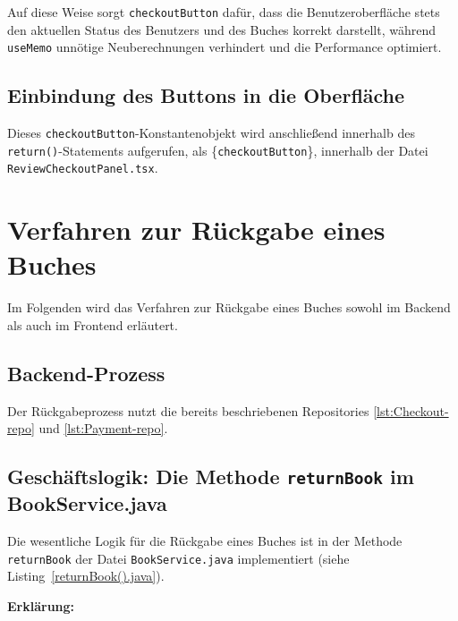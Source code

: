 \noindent Auf diese Weise sorgt \texttt{checkoutButton} dafür, dass die Benutzeroberfläche stets den aktuellen Status des Benutzers und des Buches korrekt darstellt, während \texttt{useMemo} unnötige Neuberechnungen verhindert und die Performance optimiert.
\subsection*{Einbindung des Buttons in die Oberfläche}

\noindent Dieses \texttt{checkoutButton}-Konstantenobjekt wird anschließend innerhalb des \texttt{return()}-Statements aufgerufen,  als \{\texttt{checkoutButton}\}, innerhalb der Datei \texttt{ReviewCheckoutPanel.tsx}.


\section{Verfahren zur Rückgabe eines Buches}
Im Folgenden wird das Verfahren zur Rückgabe eines Buches sowohl im Backend als auch im Frontend erläutert.

\subsection{Backend-Prozess}
Der Rückgabeprozess nutzt die bereits beschriebenen Repositories \ref{lst:Checkout-repo} und \ref{lst:Payment-repo}. 

\subsection*{Geschäftslogik: Die Methode \texttt{returnBook} im BookService.java} 

Die wesentliche Logik für die Rückgabe eines Buches ist in der Methode \texttt{returnBook} der Datei \texttt{BookService.java} implementiert (siehe Listing~\ref{returnBook().java}).

\noindent \textbf{Erklärung:}

